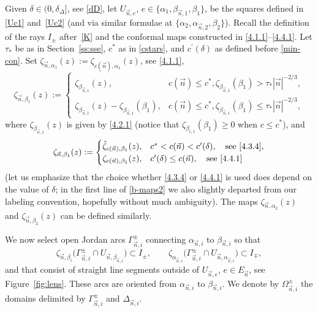 \documentclass[pdftex]{sigma}
\numberwithin{equation}{section}
\newcommand{\n}{{\vec n}}
\begin{document}
Given $ \delta\in(0,\delta_\Delta] $, see \eqref{dD}, let $ U_{\n,e} $, $ e\in \{\alpha_1,\beta_{\n,1},\beta_1\} $, be the squares defined in \eqref{Uc1} and~\eqref{Uc2} (and via similar formulae at $ \{\alpha_2,\alpha_{\n,2},\beta_2\} $). Recall the definition of the rays $ I_\pm $ after~\eqref{K} and the conformal maps constructed in \eqref{4.1.1}--\eqref{4.4.1}. Let $ \tau_* $ be as in Section~\ref{ss:sse}, $ c^* $ as in \eqref{cstars}, and $ c^\prime(\delta) $ as defined before \eqref{min-con}. Set $ \zeta_{\n,\alpha_1}(z) := \zeta_{c(\n),\alpha_1}(z) $, see \eqref{4.1.1},
\begin{equation}
\zeta_{\n,\beta_1}(z) :=
\begin{cases}
\zeta_{\beta_{\n,1}}(z), & c(\n) \leq c^*, \zeta_{\beta_{\n,1}}(\beta_1)>\tau_*|\n|^{-2/3}, \\
\zeta_{\beta_{\n,1}}(z)-\zeta_{\beta_{\n,1}}(\beta_1), & c(\n)\leq c^*, \zeta_{\beta_{\n,1}}(\beta_1)\leq \tau_*|\n|^{-2/3},
\end{cases}
\label{b-maps1}
\end{equation}
where $ \zeta_{\beta_{\n,1}}(z) $ is given by \eqref{4.2.1} (notice that $ \zeta_{\beta_{c,1}}(\beta_1)\geq0 $ when $ c\leq c^*$), and
\begin{equation}
\zeta_{\n,\beta_1}(z) :=
\begin{cases}
\hat\zeta_{c(\n),\beta_1}(z), & c^*<c(\n)<c^\prime(\delta), \quad \text{see} \ \eqref{4.3.4}, \\
\zeta_{c(\n),\beta_1}(z), & c^\prime(\delta) \leq c(\n), \quad \text{see} \ \eqref{4.4.1}
\end{cases}
\label{b-maps2}
\end{equation}
(let us emphasize that the choice whether \eqref{4.3.4} or \eqref{4.4.1} is used does depend on the value of $ \delta $; in the first line of \eqref{b-maps2} we also slightly departed from our labeling convention, hopefully without much ambiguity). The maps $ \zeta_{\n,\alpha_2}(z) $ and $ \zeta_{\n,\beta_2}(z) $ can be defined similarly.

We now select open Jordan arcs $ \Gamma_{\n,i}^\pm $ connecting $ \alpha_{\n,i} $ to $ \beta_{\n,i} $ so that
\begin{equation}
\label{Ipm}
\zeta_{\n,\beta_i}\bigl(\Gamma_{\n,i}^\pm\cap U_{\n,\beta_{\n,i}}\bigr) \subset I_\pm, \qquad \zeta_{\alpha_{\n,i}}\bigl(\Gamma_{\n,i}^\pm\cap U_{\n,\alpha_{\n,i}}\bigr) \subset I_\mp,
\end{equation}
and that consist of straight line segments outside of $ U_{\n,e} $, $ e\in E_\n $, see Figure~\ref{fig:lens}. These arcs are oriented from $ \alpha_{\n,i} $ to $ \beta_{\n,i} $. We denote by $ \Omega_{\n,i}^\pm $ the domains delimited by $ \Gamma_{\n,i}^\pm $ and $ \Delta_{\n,i} $.
\end{document}

